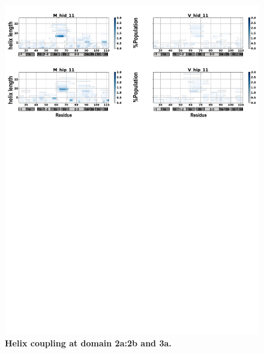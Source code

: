 \documentclass[10pt,letterpaper]{article}
\begin{document}
\begin{figure}[!ht]
\includegraphics[scale=0.5,width=12cm,trim={0 0cm 0 0cm},clip]{../figures/n1.pdf}
\caption{{\bf Helix coupling at domain 2a:2b and 3a.}
 }
\label{fig6}
\end{figure}
\end{document}
